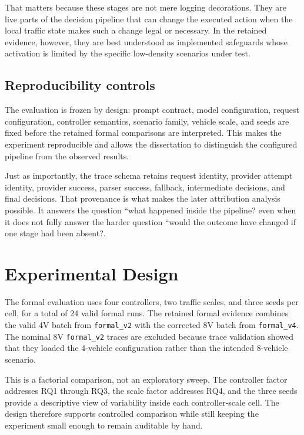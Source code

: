 \documentclass[letterpaper,10pt,conference]{ieeeconf}
\begin{document}
That matters because these stages are not mere logging decorations. They are live parts of the decision pipeline that can change the executed action when the local traffic state makes such a change legal or necessary. In the retained evidence, however, they are best understood as implemented safeguards whose activation is limited by the specific low-density scenarios under test.

\subsection{Reproducibility controls}
The evaluation is frozen by design: prompt contract, model configuration, request configuration, controller semantics, scenario family, vehicle scale, and seeds are fixed before the retained formal comparisons are interpreted. This makes the experiment reproducible and allows the dissertation to distinguish the configured pipeline from the observed results.

Just as importantly, the trace schema retains request identity, provider attempt identity, provider success, parser success, fallback, intermediate decisions, and final decisions. That provenance is what makes the later attribution analysis possible. It answers the question ``what happened inside the pipeline? even when it does not fully answer the harder question ``would the outcome have changed if one stage had been absent?.

\section{Experimental Design}
The formal evaluation uses four controllers, two traffic scales, and three seeds per cell, for a total of 24 valid formal runs. The retained formal evidence combines the valid 4V batch from \texttt{formal\_v2} with the corrected 8V batch from \texttt{formal\_v4}. The nominal 8V \texttt{formal\_v2} traces are excluded because trace validation showed that they loaded the 4-vehicle configuration rather than the intended 8-vehicle scenario.

This is a factorial comparison, not an exploratory sweep. The controller factor addresses RQ1 through RQ3, the scale factor addresses RQ4, and the three seeds provide a descriptive view of variability inside each controller-scale cell. The design therefore supports controlled comparison while still keeping the experiment small enough to remain auditable by hand.
\end{document}
